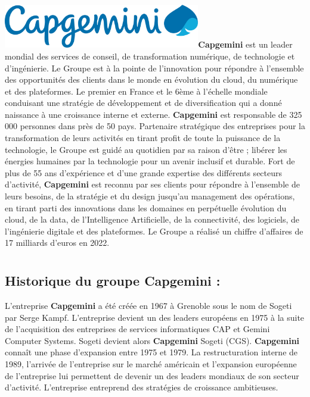 \documentclass[12pt,a4paper,twoside]{report}
\begin{document}
\includegraphics[width=3.37778in,height=0.75347in]{latex_media/media/image3.png}\textbf{Capgemini}
est un leader mondial des services de conseil, de transformation
numérique, de technologie et d'ingénierie. Le Groupe est à la pointe de
l'innovation pour répondre à l'ensemble des opportunités des clients
dans le monde en évolution du cloud, du numérique et des plateformes. Le
premier en France et le 6ème à l'échelle mondiale conduisant une
stratégie de développement et de diversification qui a donné naissance à
une croissance interne et externe. \textbf{Capgemini} est responsable de
325 000 personnes dans près de 50 pays. Partenaire stratégique des
entreprises pour la transformation de leurs activités en tirant profit
de toute la puissance de la technologie, le Groupe est guidé au
quotidien par sa raison d'être ; libérer les énergies humaines par la
technologie pour un avenir inclusif et durable. Fort de plus de 55 ans
d'expérience et d'une grande expertise des différents secteurs
d'activité, \textbf{Capgemini} est reconnu par ses clients pour répondre
à l'ensemble de leurs besoins, de la stratégie et du design jusqu'au
management des opérations, en tirant parti des innovations dans les
domaines en perpétuelle évolution du cloud, de la data, de
l'Intelligence Artificielle, de la connectivité, des logiciels, de
l'ingénierie digitale et des plateformes. Le Groupe a réalisé un chiffre
d'affaires de 17 milliards d'euros en 2022.

\hypertarget{section-1}{%
\section{}\label{section-1}}

\hypertarget{historique-du-groupe-capgemini}{%
\subsection{Historique du groupe Capgemini
:}\label{historique-du-groupe-capgemini}}

L'entreprise \textbf{Capgemini} a été créée en 1967 à Grenoble sous le
nom de Sogeti par Serge Kampf. L'entreprise devient un des leaders
européens en 1975 à la suite de l'acquisition des entreprises de
services informatiques CAP et Gemini Computer Systems. Sogeti devient
alors \textbf{Capgemini} Sogeti (CGS). \textbf{Capgemini} connaît une
phase d'expansion entre 1975 et 1979. La restructuration interne de
1989, l'arrivée de l'entreprise sur le marché américain et l'expansion
européenne de l'entreprise lui permettent de devenir un des leaders
mondiaux de son secteur d'activité. L'entreprise entreprend des
stratégies de croissance ambitieuses.
\end{document}
